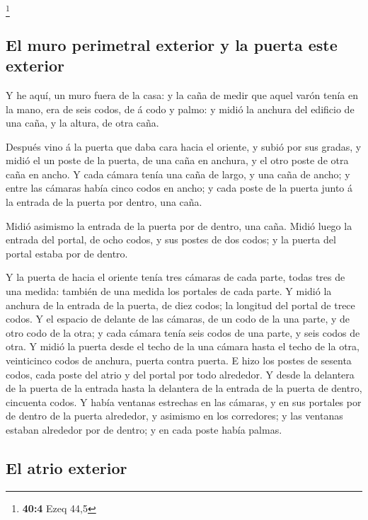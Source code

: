 \footnote{\textbf{40:4} Ezeq 44,5}

\hypertarget{el-muro-perimetral-exterior-y-la-puerta-este-exterior}{%
\subsection{El muro perimetral exterior y la puerta este
exterior}\label{el-muro-perimetral-exterior-y-la-puerta-este-exterior}}

 Y he aquí, un muro fuera de la casa: y la caña de medir
que aquel varón tenía en la mano, era de seis codos, de á codo y palmo:
y midió la anchura del edificio de una caña, y la altura, de otra caña.

 Después vino á la puerta que daba cara hacia el oriente,
y subió por sus gradas, y midió el un poste de la puerta, de una caña en
anchura, y el otro poste de otra caña en ancho.  Y cada
cámara tenía una caña de largo, y una caña de ancho; y entre las cámaras
había cinco codos en ancho; y cada poste de la puerta junto á la entrada
de la puerta por dentro, una caña.

 Midió asimismo la entrada de la puerta por de dentro, una
caña.  Midió luego la entrada del portal, de ocho codos, y
sus postes de dos codos; y la puerta del portal estaba por de dentro.

 Y la puerta de hacia el oriente tenía tres cámaras de
cada parte, todas tres de una medida: también de una medida los portales
de cada parte.  Y midió la anchura de la entrada de la
puerta, de diez codos; la longitud del portal de trece codos.
 Y el espacio de delante de las cámaras, de un codo de la
una parte, y de otro codo de la otra; y cada cámara tenía seis codos de
una parte, y seis codos de otra.  Y midió la puerta desde
el techo de la una cámara hasta el techo de la otra, veinticinco codos
de anchura, puerta contra puerta.  E hizo los postes de
sesenta codos, cada poste del atrio y del portal por todo alrededor.
 Y desde la delantera de la puerta de la entrada hasta la
delantera de la entrada de la puerta de dentro, cincuenta codos.
 Y había ventanas estrechas en las cámaras, y en sus
portales por de dentro de la puerta alrededor, y asimismo en los
corredores; y las ventanas estaban alrededor por de dentro; y en cada
poste había palmas.

\hypertarget{el-atrio-exterior}{%
\subsection{El atrio exterior}\label{el-atrio-exterior}}

